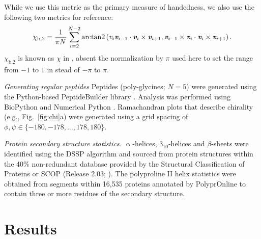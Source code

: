 \documentclass[fleqn,10pt]{wlpeerj} %
\newcommand{\Fig}[1]{Fig.~\ref{#1}}
\begin{document}
While we use this metric as the primary measure of handedness, we also use the following two metrics for reference:
\begin{equation}\label{chi2}
\displaystyle \chi_\textrm{b,2} = \frac{1}{\pi N}\sum_{i = 2}^{N-2}
 \textrm{arctan2}\left (\textit{v}_i \textit{\textbf{v}}_{i-1} \cdot \textit{\textbf{v}}_i \times \textit{\textbf{v}}_{i+1},\textit{\textbf{v}}_{i-1}\times \textit{\textbf{v}}_i \cdot \textit{\textbf{v}}_i\times \textit{\textbf{v}}_{i+1} \right ).
\end{equation}
$\chi_\textrm{b,2}$ is known as $\chi$ in \cite{Gruziel2013}, absent the normalization by $\pi$ used here to set the range from $-1$ to $1$ in stead of $-\pi$ to $\pi$. %

{\it Generating regular peptides}
Peptides (poly-glycines; $N=5$) were generated using the Python-based PeptideBuilder library \citep{Matthew2013}. Analysis was performed using BioPython \citep{Cock2009} and Numerical Python \citep{Dubois1996}. Ramachandran plots that describe chirality (e.g., \Fig{fig:chi}a) were generated using a grid spacing of $\phi,\psi \in \{-180,-178,\ldots,178,180\}$.

{\it Protein secondary structure statistics.} $\upalpha$-helices, $3_{10}$-helices and $\beta$-sheets were identified using the DSSP algorithm \citep{Zhao2005,Kabsch1983,Joosten2011} and sourced from protein structures within the 40\% non-redundant database provided by the Structural Classification of Proteins or SCOP (Release 2.03; \cite{Fox2014}). The polyproline II helix statistics were obtained from segments within 16,535 proteins annotated by PolyprOnline \citep{Chebrek2014} to contain three or more residues of the secondary structure.

\section*{Results}
\end{document}
